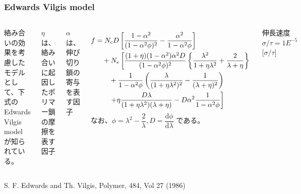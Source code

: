 \documentclass[11pt, dvipdfmx]{beamer}
\newcommand{\diff}{\mathrm d}
\begin{document}
\begin{frame}
\frametitle{Edwards Vilgis model}

\begin{columns}[totalwidth=1\textwidth]

\tiny
絡み合いの効果を考慮したモデルとして、下式の Edwards Vilgis model が知られている。

$\eta$ は、絡み合いに起因したポリマー鎖の摩擦を表す因子

$\alpha$ は、伸び切り鎖の寄与を表す因子

\begin{align*}
f
	&= N_c D \left[ \dfrac{1-\alpha^2}{(1-\alpha^2 \phi)^2} - \dfrac{\alpha^2}{1-\alpha^2 \phi} \right]\notag \\
	&\quad + N_e \left[
			\dfrac{(1+\eta)(1-\alpha^2)\alpha^2D}{(1-\alpha^2 \phi)^2} \left\{ \dfrac{\lambda^2}{1+\eta \lambda^2}
				+\dfrac{2}{\lambda+\eta} \right\} \right. \notag \\
			&\quad\quad + \dfrac{1}{1-\alpha^2\phi} \left( \dfrac{\lambda}{(1+\eta \lambda^2)^2} -\dfrac{1}{(\lambda+\eta)^2} \right) \notag \\
			&\quad\quad \left. + \eta \dfrac{D \lambda}{(1+\eta\lambda^2)(\lambda + \eta)} -D\alpha^2\dfrac{1}{1-\alpha^2\phi}
		\right]
\end{align*}
なお、$\phi=\lambda^2-\dfrac{2}{\lambda}, D=\dfrac{\diff \phi}{\diff \lambda}$ である。

\begin{center}
伸長速度 $\sigma/\tau = 1E^{-5}$ [$\sigma/\tau$]
\end{center}
\vspace{-3mm}
\includegraphics[width=\columnwidth]{./fig/E_V.pdf}
\end{columns}
\vspace{3mm}
\footnotesize
S. F. Edwards and Th. Vilgis, Polymer, 484, Vol 27 (1986)
\end{frame}
\end{document}
